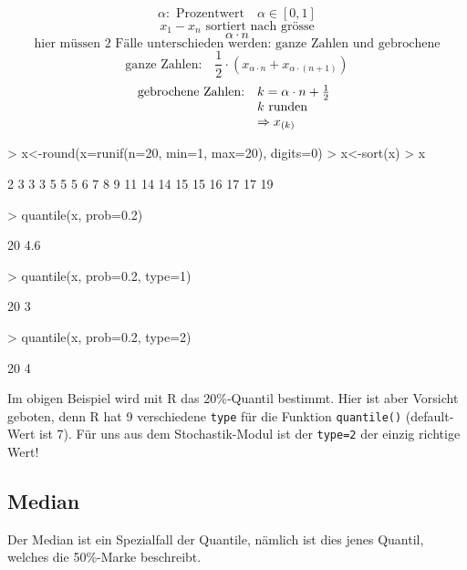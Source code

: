 \[ \alpha: \text{ Prozentwert} \quad \alpha \in [0,1] \]
\[ x_1 - x_n \text{ sortiert nach grösse}  \]
\[ \alpha \cdot n \]
\[ \text{hier müssen 2 Fälle unterschieden werden: ganze Zahlen und gebrochene} \]
\[ \text{ganze Zahlen:} \quad \frac{1}{2} 
\cdot (x_{\alpha \cdot n} + x_{\alpha \cdot (n+1)}) \]
\[ \begin{array}{@{}@{}ll}
	\text{gebrochene Zahlen:} & k=\alpha \cdot n + \frac{1}{2} \\
	                          & k \text{ runden} \\
				  & \Rightarrow x_{(k)}
\end{array}\]

\begin{Schunk}
\begin{Sinput}
> x<-round(x=runif(n=20, min=1, max=20), digits=0)
> x<-sort(x)
> x
\end{Sinput}
\begin{Soutput}
 [1]  2  3  3  3  5  5  5  6  7  8  9 11 14 14 15 15 16 17 17 19
\end{Soutput}
\begin{Sinput}
> quantile(x, prob=0.2)
\end{Sinput}
\begin{Soutput}
20%
4.6 
\end{Soutput}
\begin{Sinput}
> quantile(x, prob=0.2, type=1)
\end{Sinput}
\begin{Soutput}
20%
  3 
\end{Soutput}
\begin{Sinput}
> quantile(x, prob=0.2, type=2)
\end{Sinput}
\begin{Soutput}
20%
  4 
\end{Soutput}
\end{Schunk}
Im obigen Beispiel wird mit R das 20\%-Quantil bestimmt. Hier ist aber 
Vorsicht geboten, denn R hat 9 verschiedene \verb!type! für die Funktion
\verb!quantile()! (default-Wert ist 7). Für uns aus dem 
Stochastik-Modul ist der \verb!type=2! 
der einzig richtige Wert!

\subsection{Median}
Der Median ist ein Spezialfall der Quantile, nämlich ist dies jenes Quantil,
welches die 50\%-Marke beschreibt.

